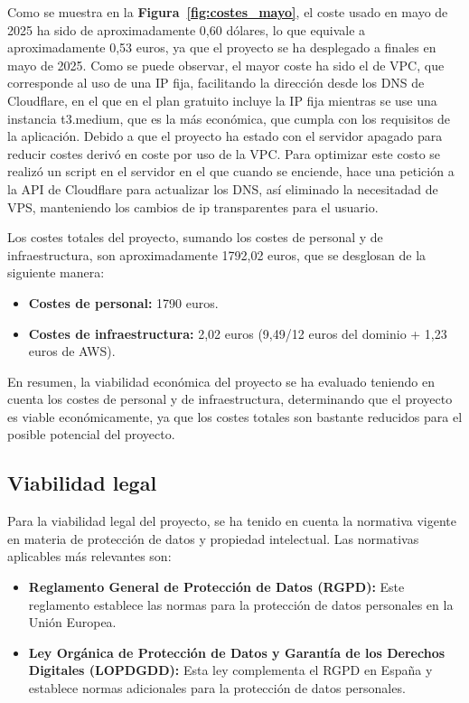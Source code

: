 Como se muestra en la \textbf{Figura~\ref{fig:costes_mayo}}, el coste usado en mayo de 2025 ha sido de aproximadamente 0,60 dólares, lo que equivale a aproximadamente 0,53 euros, ya que el proyecto se ha desplegado a finales en mayo de 2025. Como se puede observar, el mayor coste ha sido el de VPC, que corresponde al uso de una IP fija, facilitando la dirección desde los DNS de Cloudflare, en el que en el plan gratuito incluye la IP fija mientras se use una instancia t3.medium, que es la más económica, que cumpla con los requisitos de la aplicación. Debido a que el proyecto ha estado con el servidor apagado para reducir costes derivó en coste por uso de la VPC. Para optimizar este costo se realizó un script en el servidor en el que cuando se enciende, hace una petición a la API de Cloudflare para actualizar los DNS, así eliminado la necesitadad de VPS, manteniendo los cambios de ip transparentes para el usuario.


Los costes totales del proyecto, sumando los costes de personal y de infraestructura, son aproximadamente 1792,02 euros, que se desglosan de la siguiente manera:
\begin{itemize}
    \item \textbf{Costes de personal:} 1790 euros.
    \item \textbf{Costes de infraestructura:} 2,02 euros (9,49/12 euros del dominio + 1,23 euros de AWS).
\end{itemize}


En resumen, la viabilidad económica del proyecto se ha evaluado teniendo en cuenta los costes de personal y de infraestructura, determinando que el proyecto es viable económicamente, ya que los costes totales son bastante reducidos para el posible potencial del proyecto.

\subsection{Viabilidad legal}
Para la viabilidad legal del proyecto, se ha tenido en cuenta la normativa vigente en materia de protección de datos y propiedad intelectual.
Las normativas aplicables más relevantes son:
\begin{itemize}
    \item \textbf{Reglamento General de Protección de Datos (RGPD):} Este reglamento establece las normas para la protección de datos personales en la Unión Europea.~\cite{RGPD}
    \item \textbf{Ley Orgánica de Protección de Datos y Garantía de los Derechos Digitales (LOPDGDD):} Esta ley complementa el RGPD en España y establece normas adicionales para la protección de datos personales.~\cite{LOPDGDD}	
\end{itemize}

